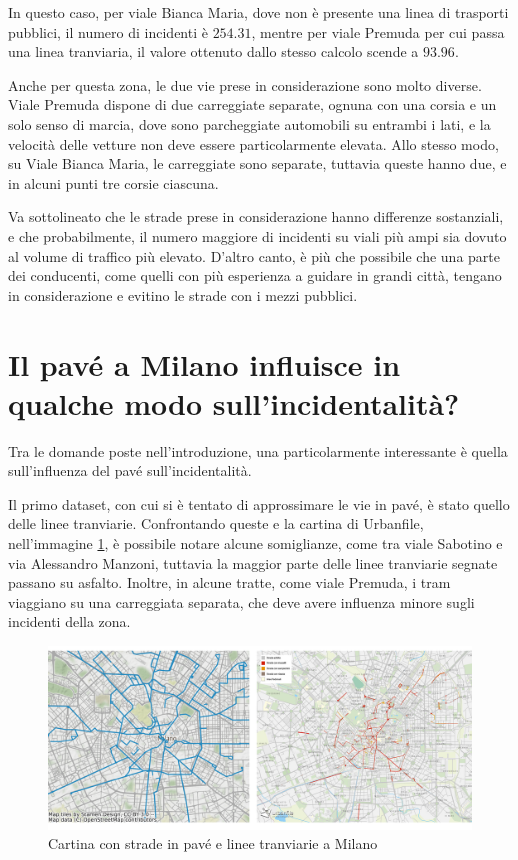 \documentclass[a4paper,12pt]{report}
\begin{document}
In questo caso, per viale Bianca Maria, dove non è presente una linea di trasporti pubblici, 
il numero di incidenti è $254.31$, mentre per viale Premuda per cui passa una linea tranviaria, 
il valore ottenuto dallo stesso calcolo scende a $93.96$. 

Anche per questa zona, le due vie prese in considerazione sono molto diverse. 
Viale Premuda dispone di due carreggiate separate, ognuna con una corsia e un solo senso 
di marcia, dove sono parcheggiate automobili su entrambi i lati, e la velocità delle 
vetture non deve essere particolarmente elevata. 
Allo stesso modo, su Viale Bianca Maria, le carreggiate sono separate, tuttavia queste 
hanno due, e in alcuni punti tre corsie ciascuna. 

Va sottolineato che le strade prese in considerazione hanno differenze sostanziali, 
e che probabilmente, il numero maggiore di incidenti su viali più ampi sia dovuto al 
volume di traffico più elevato. 
D'altro canto, è più che possibile che una parte dei conducenti, 
come quelli con più esperienza 
a guidare in grandi città, tengano in considerazione e evitino le strade con i mezzi pubblici. 

\section{Il pavé a Milano influisce in qualche modo sull'incidentalità?}

Tra le domande poste nell'introduzione, una particolarmente interessante è quella 
sull'influenza del pavé sull'incidentalità. 

Il primo dataset, con cui si è tentato di approssimare le vie in pavé, è stato quello 
delle linee tranviarie. 
Confrontando queste e la cartina di Urbanfile, nell'immagine \ref{fig:tram-pave-milano}, 
è possibile notare alcune somiglianze, come tra viale Sabotino e via 
Alessandro Manzoni, tuttavia la maggior parte delle linee tranviarie segnate 
passano su asfalto. 
Inoltre, in alcune tratte, come viale Premuda, i tram viaggiano su una carreggiata separata, 
che deve avere influenza minore sugli incidenti della zona. 

\begin{figure}
    \includegraphics[width=\linewidth]{../src/tram/tram_milano.png}
    \caption{Cartina con strade in pavé e linee tranviarie a Milano}
    \label{fig:tram-pave-milano}
\end{figure}
\end{document}
